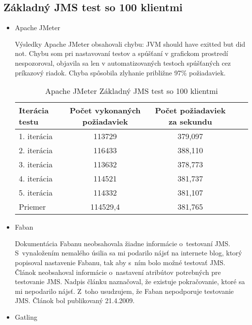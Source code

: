 \documentclass[12pt,oneside,final]{fithesis-utf8}
\begin{document}
\subsection{Základný JMS test so 100 klientmi}

\begin{itemize}

\item Apache JMeter

Výsledky Apache JMeter obsahovali chybu: JVM should have exitted but did not. Chybu som pri nastavovaní testov a spúšťaní v grafickom prostredí nespozoroval, objavila sa len v automatizovaných testoch spúšťaných cez príkazový riadok. Chyba spôsobila zlyhanie približne 97\% požiadaviek.

\begin{table}[H]
\begin{center}
\begin{tabular}{ | l | c | c | c | c |}
		\hline
		 \textbf{Iterácia testu} & \textbf{Počet vykonaných požiadaviek} & \textbf{Počet požiadaviek za sekundu} \\ \hline
		 1. iterácia & 113729 & 379,097 \\ \hline
		 2. iterácia & 116433 & 388,110 \\ \hline
		 3. iterácia & 113632 & 378,773 \\ \hline
		 4. iterácia & 114521 & 381,737 \\ \hline
		 5. iterácia & 114332 & 381,107 \\ \hline
		 Priemer & 114529,4 & 381,765 \\ \hline
		 
\end{tabular}
\end{center}
\caption{Apache JMeter Základný JMS test so 100 klientmi}
\end{table}

\item Faban

Dokumentácia Fabanu neobsahovala žiadne informácie o~testovaní JMS. S~vynaložením nemalého úsilia sa mi podarilo nájsť na internete blog, ktorý popisoval nastavenie Fabanu, tak aby s~ním bolo možné testovať JMS. Článok neobsahoval informácie o~nastavení atribútov potrebných pre testovanie JMS. Nadpis článku naznačoval, že existuje pokračovanie, ktoré sa mi nepodarilo nájsť. Z~toho usudzujem, že Faban nepodporuje testovanie JMS. Článok bol publikovaný 21.4.2009\cite{FabanBlog}.

\item Gatling


\end{itemize}
\end{document}
